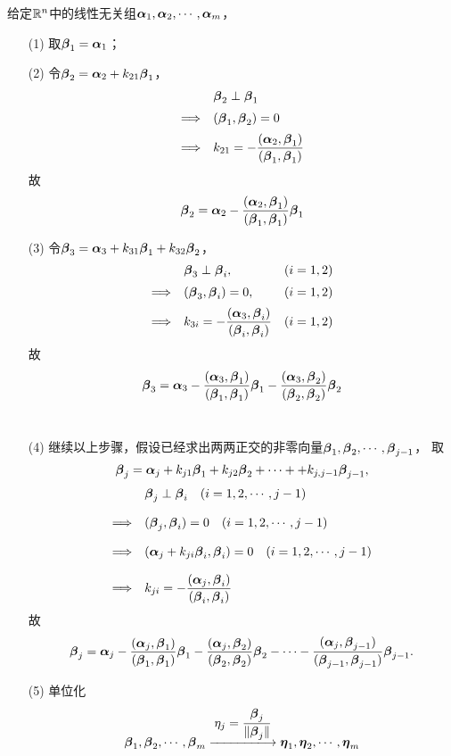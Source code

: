 \begin{frame}[allowframebreaks]\ft{\subsecname}

  给定$\mathbb R^n$中的线性无关组$\boldsymbol{\alpha}_1,\boldsymbol{\alpha}_2,\cdots,\boldsymbol{\alpha}_m$， 
  \begin{itemize}
  \item[(1)] 取$\boldsymbol{\beta}_1=\boldsymbol{\alpha}_1$；\\[0.3in]
  \item[(2)] 令$\boldsymbol{\beta}_2=\boldsymbol{\alpha}_2+k_{21}\boldsymbol{\beta}_1$，
    $$
    \begin{array}{rl}
      &\boldsymbol{\beta}_2\perp\boldsymbol{\beta}_1\\[0.2cm]
      \Longrightarrow&(\boldsymbol{\beta}_1,\boldsymbol{\beta}_2)=0\\[0.2cm] 
      \Longrightarrow& \displaystyle k_{21}=-\frac{(\boldsymbol{\alpha}_2,\boldsymbol{\beta}_1)}{(\boldsymbol{\beta}_1,\boldsymbol{\beta}_1)} 
    \end{array}
    $$
    故
    $$
    \boldsymbol{\beta}_2=\boldsymbol{\alpha}_2-\frac{(\boldsymbol{\alpha}_2,\boldsymbol{\beta}_1)}{(\boldsymbol{\beta}_1,\boldsymbol{\beta}_1)}\boldsymbol{\beta}_1
    $$
  \item[(3)] 令$\boldsymbol{\beta}_3=\boldsymbol{\alpha}_3+k_{31}\boldsymbol{\beta}_1+k_{32}\boldsymbol{\beta}_2$，
    $$
    \begin{array}{rll}
      &\boldsymbol{\beta}_3\perp\boldsymbol{\beta}_i, & (i=1,2)\\[0.2cm] 
      \Longrightarrow&(\boldsymbol{\beta}_3,\boldsymbol{\beta}_i)=0, & (i=1,2)\\[0.2cm] 
      \Longrightarrow& \displaystyle k_{3i}=-\frac{(\boldsymbol{\alpha}_3,\boldsymbol{\beta}_i)}{(\boldsymbol{\beta}_i,\boldsymbol{\beta}_i)} & (i=1,2) 
    \end{array}
    $$
    故
    $$
    \boldsymbol{\beta}_3=\boldsymbol{\alpha}_3-\frac{(\boldsymbol{\alpha}_3,\boldsymbol{\beta}_1)}{(\boldsymbol{\beta}_1,\boldsymbol{\beta}_1)}\boldsymbol{\beta}_1
    -\frac{(\boldsymbol{\alpha}_3,\boldsymbol{\beta}_2)}{(\boldsymbol{\beta}_2,\boldsymbol{\beta}_2)}\boldsymbol{\beta}_2
    $$ \\[1in]
  \item[(4)] 继续以上步骤，假设已经求出两两正交的非零向量$\boldsymbol{\beta}_1,\boldsymbol{\beta}_2,\cdots,\boldsymbol{\beta}_{j-1}$，
    取
    $$
    \boldsymbol{\beta}_j=\boldsymbol{\alpha}_j+k_{j1}\boldsymbol{\beta}_1+k_{j2}\boldsymbol{\beta}_2+\cdots++k_{j,j-1}\boldsymbol{\beta}_{j-1},
    $$
    $$
    \begin{array}{rl}
      & \boldsymbol{\beta}_j \perp \boldsymbol{\beta}_i\quad (i=1,2,\cdots,j-1)\\[0.4cm] 
      \Longrightarrow &(\boldsymbol{\beta}_j,\boldsymbol{\beta}_i)=0 \quad (i=1,2,\cdots,j-1)\\[0.4cm] 
      \Longrightarrow &(\boldsymbol{\alpha}_j+k_{ji}\boldsymbol{\beta}_i,\boldsymbol{\beta}_i)=0 \quad (i=1,2,\cdots,j-1)\\[0.4cm] 
      \Longrightarrow& \displaystyle k_{ji}=-\frac{(\boldsymbol{\alpha}_j,\boldsymbol{\beta}_i)}{(\boldsymbol{\beta}_i,\boldsymbol{\beta}_i)} 
    \end{array}
    $$
    故
    $$
    \boldsymbol{\beta}_j=\boldsymbol{\alpha}_j-\frac{(\boldsymbol{\alpha}_j,\boldsymbol{\beta}_1)}{(\boldsymbol{\beta}_1,\boldsymbol{\beta}_1)}\boldsymbol{\beta}_1
    -\frac{(\boldsymbol{\alpha}_j,\boldsymbol{\beta}_2)}{(\boldsymbol{\beta}_2,\boldsymbol{\beta}_2)}\boldsymbol{\beta}_2
    -\cdots
    -\frac{(\boldsymbol{\alpha}_j,\boldsymbol{\beta}_{j-1})}{(\boldsymbol{\beta}_{j-1},\boldsymbol{\beta}_{j-1})}\boldsymbol{\beta}_{j-1}.
    $$
  \item[(5)] 单位化
    $$
    \betabd_1, \betabd_2, \cd, \betabd_m \xlongrightarrow[]{\ds \eta_j=\frac{\betabd_j}{\|\betabd_j\|}}
    \etabd_1, \etabd_2, \cd, \etabd_m
    $$
  \end{itemize}

\end{frame}


